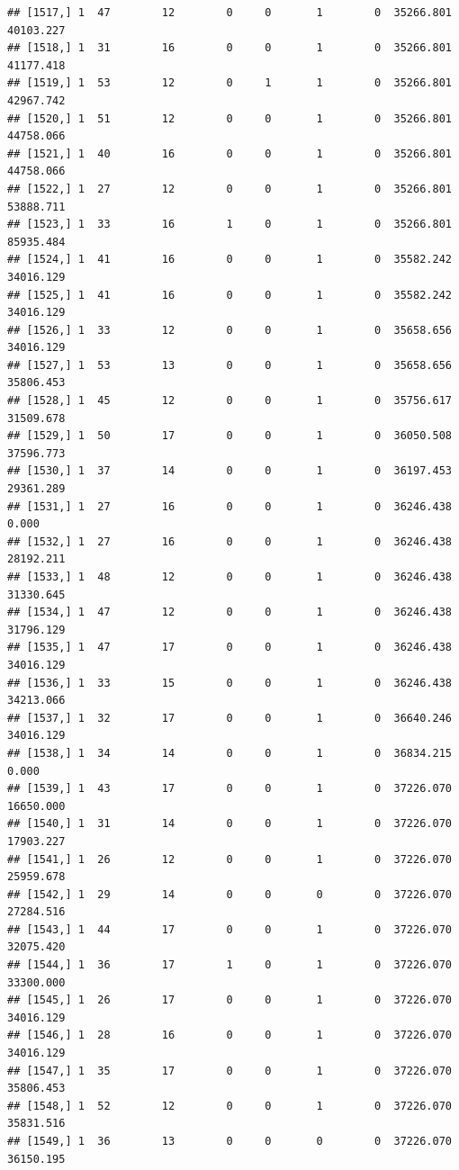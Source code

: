 \documentclass[
]{article}
\begin{document}
\begin{verbatim}
## [1517,] 1  47        12        0     0       1        0  35266.801  40103.227
## [1518,] 1  31        16        0     0       1        0  35266.801  41177.418
## [1519,] 1  53        12        0     1       1        0  35266.801  42967.742
## [1520,] 1  51        12        0     0       1        0  35266.801  44758.066
## [1521,] 1  40        16        0     0       1        0  35266.801  44758.066
## [1522,] 1  27        12        0     0       1        0  35266.801  53888.711
## [1523,] 1  33        16        1     0       1        0  35266.801  85935.484
## [1524,] 1  41        16        0     0       1        0  35582.242  34016.129
## [1525,] 1  41        16        0     0       1        0  35582.242  34016.129
## [1526,] 1  33        12        0     0       1        0  35658.656  34016.129
## [1527,] 1  53        13        0     0       1        0  35658.656  35806.453
## [1528,] 1  45        12        0     0       1        0  35756.617  31509.678
## [1529,] 1  50        17        0     0       1        0  36050.508  37596.773
## [1530,] 1  37        14        0     0       1        0  36197.453  29361.289
## [1531,] 1  27        16        0     0       1        0  36246.438      0.000
## [1532,] 1  27        16        0     0       1        0  36246.438  28192.211
## [1533,] 1  48        12        0     0       1        0  36246.438  31330.645
## [1534,] 1  47        12        0     0       1        0  36246.438  31796.129
## [1535,] 1  47        17        0     0       1        0  36246.438  34016.129
## [1536,] 1  33        15        0     0       1        0  36246.438  34213.066
## [1537,] 1  32        17        0     0       1        0  36640.246  34016.129
## [1538,] 1  34        14        0     0       1        0  36834.215      0.000
## [1539,] 1  43        17        0     0       1        0  37226.070  16650.000
## [1540,] 1  31        14        0     0       1        0  37226.070  17903.227
## [1541,] 1  26        12        0     0       1        0  37226.070  25959.678
## [1542,] 1  29        14        0     0       0        0  37226.070  27284.516
## [1543,] 1  44        17        0     0       1        0  37226.070  32075.420
## [1544,] 1  36        17        1     0       1        0  37226.070  33300.000
## [1545,] 1  26        17        0     0       1        0  37226.070  34016.129
## [1546,] 1  28        16        0     0       1        0  37226.070  34016.129
## [1547,] 1  35        17        0     0       1        0  37226.070  35806.453
## [1548,] 1  52        12        0     0       1        0  37226.070  35831.516
## [1549,] 1  36        13        0     0       0        0  37226.070  36150.195

\end{verbatim}
\end{document}
